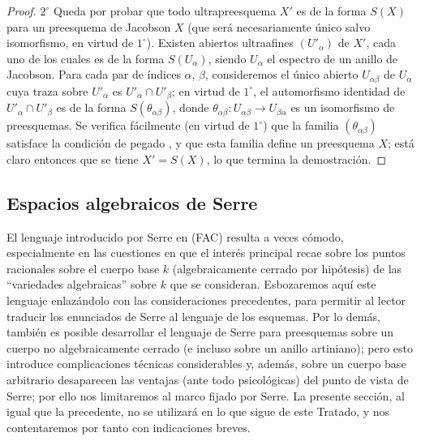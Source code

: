 \begin{proof}
$2^\circ$ Queda por probar que todo ultrapreesquema $X'$ es de la forma $S(X)$ para un preesquema de Jacobson $X$ (que será necesariamente único salvo isomorfismo, en virtud de $1^\circ$).
Existen abiertos ultraafines $(U'_\alpha)$ de $X'$, cada uno de los cuales es de la forma $S(U_\alpha)$, siendo $U_\alpha$ el espectro de un anillo de Jacobson.
Para cada par de índices $\alpha$, $\beta$, consideremos el único abierto $U_{\alpha\beta}$ de $U_\alpha$ cuya traza sobre $U'_\alpha$ es $U'_\alpha\cap U'_\beta$; en virtud de $1^\circ$, el automorfismo identidad de $U'_\alpha\cap U'_\beta$ es de la forma $S(\theta_{\alpha\beta})$, donde $\theta_{\alpha\beta}:U_{\alpha\beta}\to U_{\beta\alpha}$ es un isomorfismo de preesquemas.
Se verifica fácilmente (en virtud de $1^\circ$) que la familia $(\theta_{\alpha\beta})$ satisface la condición de pegado , y que esta familia define un preesquema $X$; está claro entonces que se tiene $X'=S(X)$, lo que termina la demostración.
\end{proof}

\subsection{Espacios algebraicos de Serre}
\label{subsection:IV.10.10}

\begin{env}[10.10.1]
\label{IV.10.10.1}
El lenguaje introducido por Serre en (FAC) resulta a veces cómodo, especialmente en las cuestiones en que el interés principal recae sobre los puntos racionales sobre el cuerpo base $k$ (algebraicamente cerrado por hipótesis) de las ``variedades algebraicas'' sobre $k$ que se consideran.
Esbozaremos aquí este lenguaje enlazándolo con las consideraciones precedentes, para permitir al lector traducir los enunciados de Serre al lenguaje de los esquemas.
Por lo demás, también es posible desarrollar el lenguaje de Serre para preesquemas sobre un cuerpo no algebraicamente cerrado (e incluso sobre un anillo artiniano); pero esto introduce complicaciones técnicas considerables y, además, sobre un cuerpo base arbitrario desaparecen las ventajas (ante todo psicológicas) del punto de vista de Serre; por ello nos limitaremos al marco fijado por Serre.
La presente sección, al igual que la precedente, no se utilizará en lo que sigue de este Tratado, y nos contentaremos por tanto con indicaciones breves.
\end{env}



